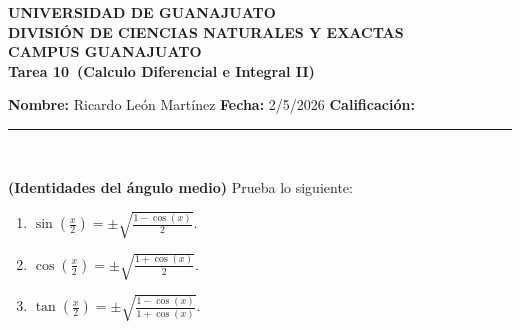 \documentclass[12pt,a4paper]{article}
\newcommand{\alumno}{Ricardo León Martínez}
\newcommand{\materia}{Calculo Diferencial e Integral II}
\newcommand{\tarea}{Tarea 10}
\newcommand{\fecha}{2/5/2026}
\begin{document}
    \begin{center}
    {\large\textbf{UNIVERSIDAD DE GUANAJUATO}}\\[0.3cm]
    {\normalsize\textbf{DIVISIÓN DE CIENCIAS NATURALES Y EXACTAS}}\\
    {\normalsize\textbf{CAMPUS GUANAJUATO}}\\[1cm]

    {\Large\textbf{\tarea\ (\materia)}}\\[1cm]
    \end{center}

    \textbf{Nombre:} \alumno \hfill 
    \textbf{Fecha:} \fecha \hfill 
    \textbf{Calificación:} \rule{3cm}{0.4pt} \\[0.3cm]

    \begin{mdframed}[style=mdpinkbox,frametitle={Ejercicio 1}]
        \textbf{(Identidades del ángulo medio)} Prueba lo siguiente:
        \begin{enumerate}
            \item[(a)] $\sin(\frac{x}{2})=\pm\sqrt{\frac{1-\cos(x)}{2}}$.
            \item[(b)] $\cos(\frac{x}{2})=\pm\sqrt{\frac{1+\cos(x)}{2}}$.
            \item[(c)] $\tan(\frac{x}{2})=\pm\sqrt{\frac{1-\cos(x)}{1+\cos(x)}}$.  
        \end{enumerate}
    \end{mdframed}
\end{document}
